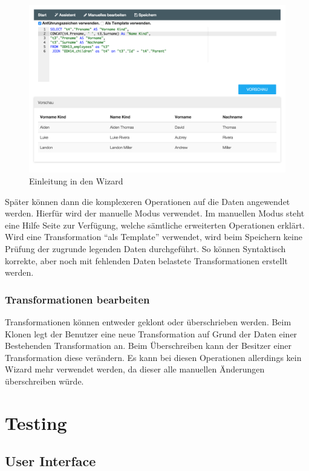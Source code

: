  \xxx[ref]
\begin{figure}[H]
\centering
\includegraphics[width=\linewidth]{fig/wizard-manual.png}
\caption{Einleitung in den Wizard}
\label{fig:pd:caches}
\end{figure}

Später können dann die komplexeren Operationen auf die Daten angewendet werden. Hierfür wird der manuelle Modus verwendet. Im manuellen Modus steht eine Hilfe Seite zur Verfügung, welche sämtliche erweiterten Operationen erklärt.\\
Wird eine Transformation ``als Template'' verwendet, wird beim Speichern keine Prüfung der zugrunde legenden Daten durchgeführt. So können Syntaktisch korrekte, aber noch mit fehlenden Daten belastete Transformationen erstellt werden.

\subsection{Transformationen bearbeiten}
Transformationen können entweder geklont oder überschrieben werden. Beim Klonen legt der Benutzer eine neue Transformation auf Grund der Daten einer Bestehenden Transformation an. Beim Überschreiben kann der Besitzer einer Transformation diese verändern. Es kann bei diesen Operationen allerdings kein Wizard mehr verwendet werden, da dieser alle manuellen Änderungen überschreiben würde.


\chapter{Testing}
\section{User Interface}

